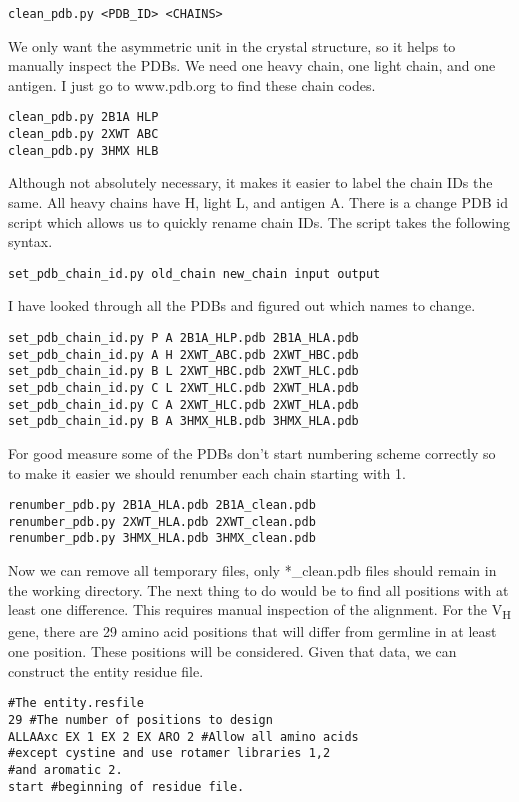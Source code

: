 \begin{verbatim}
clean_pdb.py <PDB_ID> <CHAINS>
\end{verbatim}

We only want the asymmetric unit in the crystal structure, so it helps to manually inspect the PDBs. We need one heavy chain, one light chain, and one antigen. I just go to www.pdb.org to find these chain codes.
\begin{verbatim}
clean_pdb.py 2B1A HLP
clean_pdb.py 2XWT ABC
clean_pdb.py 3HMX HLB
\end{verbatim}
Although not absolutely necessary, it makes it easier to label the chain IDs the same. All heavy chains have H, light L, and antigen A. There is a change PDB id script which allows us to quickly rename chain IDs. The script takes the following syntax.

\begin{verbatim}
set_pdb_chain_id.py old_chain new_chain input output
\end{verbatim}
I have looked through all the PDBs and figured out which names to change.

\begin{verbatim}
set_pdb_chain_id.py P A 2B1A_HLP.pdb 2B1A_HLA.pdb
set_pdb_chain_id.py A H 2XWT_ABC.pdb 2XWT_HBC.pdb
set_pdb_chain_id.py B L 2XWT_HBC.pdb 2XWT_HLC.pdb
set_pdb_chain_id.py C L 2XWT_HLC.pdb 2XWT_HLA.pdb
set_pdb_chain_id.py C A 2XWT_HLC.pdb 2XWT_HLA.pdb
set_pdb_chain_id.py B A 3HMX_HLB.pdb 3HMX_HLA.pdb
\end{verbatim}
For good measure some of the PDBs don't start numbering scheme correctly so to make it easier we should renumber each chain starting with 1.

\begin{verbatim}
renumber_pdb.py 2B1A_HLA.pdb 2B1A_clean.pdb
renumber_pdb.py 2XWT_HLA.pdb 2XWT_clean.pdb
renumber_pdb.py 3HMX_HLA.pdb 3HMX_clean.pdb
\end{verbatim}
Now we can remove all temporary files, only *\_clean.pdb files should remain in the working directory. The next thing to do would be to find all positions with at least one difference. This requires manual inspection of the alignment. For the V\textsubscript{H} gene, there are 29 amino acid positions that will differ from germline in at least one position. These positions will be considered. Given that data, we can construct the entity residue file.

\begin{verbatim}
#The entity.resfile
29 #The number of positions to design
ALLAAxc EX 1 EX 2 EX ARO 2 #Allow all amino acids
#except cystine and use rotamer libraries 1,2
#and aromatic 2.
start #beginning of residue file.
\end{verbatim}

